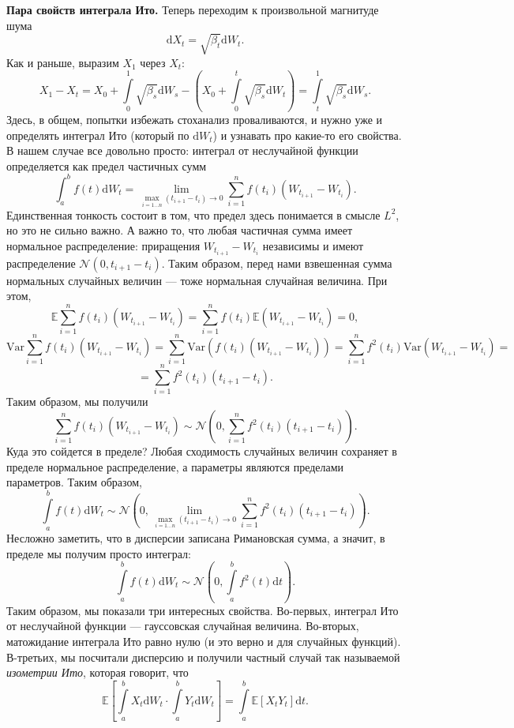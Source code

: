 \documentclass[12pt]{article}
\theoremstyle{definition}
\begin{document}
\noindent\textbf{Пара свойств интеграла Ито.} Теперь переходим к произвольной магнитуде шума
\[
    \mathrm{d}X_t = \sqrt{\beta_t} \mathrm{d} W_t.
\]
Как и раньше, выразим $X_1$ через $X_t$:
\[
    X_1 - X_t = X_0 + \int\limits_{0}^{1} \sqrt{\beta_s} \mathrm{d} W_s - \left(X_0 + \int\limits_{0}^{t} \sqrt{\beta_s} \mathrm{d}W_t\right) = \int\limits_{t}^{1} \sqrt{\beta_s}\mathrm{d} W_s.
\]
Здесь, в общем, попытки избежать стоханализ проваливаются, и нужно уже и определять интеграл Ито (который по $\mathrm{d} W_t$) и узнавать про какие-то его свойства. В нашем случае все довольно просто: интеграл от неслучайной функции определяется как предел частичных сумм
\[
    \int_{a}^{b} f(t) \mathrm{d} W_t = \lim\limits_{\max\limits_{i = 1\ldots n}\left(t_{i + 1} - t_{i}\right) \rightarrow 0}\sum\limits_{i = 1}^{n} f(t_i) (W_{t_{i + 1}} - W_{t_i}).
\]
Единственная тонкость состоит в том, что предел здесь понимается в смысле $L^2$, но это не сильно важно. А важно то, что любая частичная сумма имеет нормальное распределение: приращения $W_{t_{i+1}} - W_{t_i}$ независимы и имеют распределение $\mathcal{N}(0, t_{i + 1} - t_{i})$. Таким образом, перед нами взвешенная сумма нормальных случайных величин --- тоже нормальная случайная величина. При этом,
\[
    \mathbb{E} \sum\limits_{i = 1}^{n} f(t_i)(W_{t_{i+1}} - W_{t_i}) = \sum\limits_{i = 1}^{n}f(t_i) \mathbb{E}(W_{t_{i+1}} - W_{t_i}) = 0,
\]
\[
    \text{Var} \sum\limits_{i = 1}^{n} f(t_i)(W_{t_{i+1}} - W_{t_i}) = \sum\limits_{i = 1}^{n} \text{Var}\left( f(t_i)(W_{t_{i+1}} - W_{t_i})\right) = \sum\limits_{i=1}^{n}f^2(t_i) \text{Var}(W_{t_{i+1}} - W_{t_i}) =
\]
\[
    = \sum\limits_{i = 1}^{n} f^2(t_i) (t_{i + 1} - t_i).
\]
Таким образом, мы получили 
\[
    \sum\limits_{i = 1}^{n} f(t_i)(W_{t_{i+1}} - W_{t_i}) \sim \mathcal{N}\left(0, \sum\limits_{i = 1}^{n} f^2(t_i)(t_{i + 1} - t_i) \right).
\]
Куда это сойдется в пределе? Любая сходимость случайных величин сохраняет в пределе нормальное распределение, а параметры являются пределами параметров. Таким образом,
\[
    \int\limits_{a}^{b} f(t) \mathrm{d} W_t \sim \mathcal{N}\left(0, \lim\limits_{\max\limits_{i = 1\ldots n}\left(t_{i + 1} - t_i\right) \rightarrow 0} \sum\limits_{i = 1}^{n} f^2(t_i)(t_{i + 1} - t_i)\right).
\]
Несложно заметить, что в дисперсии записана Римановская сумма, а значит, в пределе мы получим просто интеграл:
\[
    \int\limits_{a}^{b} f(t) \mathrm{d} W_t \sim \mathcal{N}\left(0, \int\limits_{a}^{b} f^2(t) \mathrm{d} t \right).
\]
Таким образом, мы показали три интересных свойства. Во-первых, интеграл Ито от неслучайной функции --- гауссовская случайная величина. Во-вторых, матожидание интеграла Ито равно нулю (и это верно и для случайных функций). В-третьих, мы посчитали дисперсию и получили частный случай так называемой \emph{изометрии Ито}, которая говорит, что
\[
    \mathbb{E} \left[ \int\limits_{a}^{b} X_t \mathrm{d} W_t \cdot \int\limits_{a}^{b} Y_t \mathrm{d} W_t \right] = \int\limits_{a}^{b} \mathbb{E} \left[X_t Y_t\right] \mathrm{d} t.
\]
\end{document}
